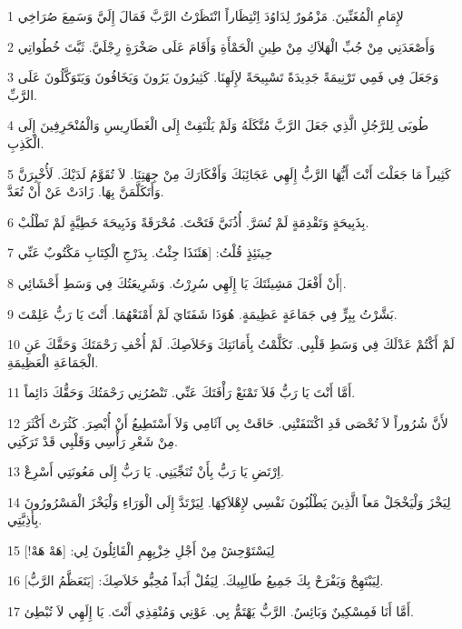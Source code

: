 \par 1 لإِمَامِ الْمُغَنِّينَ. مَزْمُورٌ لِدَاوُدَ اِنْتِظَاراً انْتَظَرْتُ الرَّبَّ فَمَالَ إِلَيَّ وَسَمِعَ صُرَاخِي
\par 2 وَأَصْعَدَنِي مِنْ جُبِّ الْهَلاَكِ مِنْ طِينِ الْحَمْأَةِ وَأَقَامَ عَلَى صَخْرَةٍ رِجْلَيَّ. ثَبَّتَ خُطُواتِي
\par 3 وَجَعَلَ فِي فَمِي تَرْنِيمَةً جَدِيدَةً تَسْبِيحَةً لإِلَهِنَا. كَثِيرُونَ يَرُونَ وَيَخَافُونَ وَيَتَوَكَّلُونَ عَلَى الرَّبِّ.
\par 4 طُوبَى لِلرَّجُلِ الَّذِي جَعَلَ الرَّبَّ مُتَّكَلَهُ وَلَمْ يَلْتَفِتْ إِلَى الْغَطَارِيسِ وَالْمُنْحَرِفِينَ إِلَى الْكَذِبِ.
\par 5 كَثِيراً مَا جَعَلْتَ أَنْتَ أَيُّهَا الرَّبُّ إِلَهِي عَجَائِبَكَ وَأَفْكَارَكَ مِنْ جِهَتِنَا. لاَ تُقَوَّمُ لَدَيْكَ. لَأُخْبِرَنَّ وَأَتَكَلَّمَنَّ بِهَا. زَادَتْ عَنْ أَنْ تُعَدَّ.
\par 6 بِذَبِيحَةٍ وَتَقْدِمَةٍ لَمْ تُسَرَّ. أُذُنَيَّ فَتَحْتَ. مُحْرَقَةً وَذَبِيحَةَ خَطِيَّةٍ لَمْ تَطْلُبْ.
\par 7 حِينَئِذٍ قُلْتُ: [هَئَنَذَا جِئْتُ. بِدَرْجِ الْكِتَابِ مَكْتُوبٌ عَنِّي
\par 8 أَنْ أَفْعَلَ مَشِيئَتَكَ يَا إِلَهِي سُرِرْتُ. وَشَرِيعَتُكَ فِي وَسَطِ أَحْشَائِي].
\par 9 بَشَّرْتُ بِبِرٍّ فِي جَمَاعَةٍ عَظِيمَةٍ. هُوَذَا شَفَتَايَ لَمْ أَمْنَعْهُمَا. أَنْتَ يَا رَبُّ عَلِمْتَ.
\par 10 لَمْ أَكْتُمْ عَدْلَكَ فِي وَسَطِ قَلْبِي. تَكَلَّمْتُ بِأَمَانَتِكَ وَخَلاَصِكَ. لَمْ أُخْفِ رَحْمَتَكَ وَحَقَّكَ عَنِ الْجَمَاعَةِ الْعَظِيمَةِ.
\par 11 أَمَّا أَنْتَ يَا رَبُّ فَلاَ تَمْنَعْ رَأْفَتَكَ عَنِّي. تَنْصُرُنِي رَحْمَتُكَ وَحَقُّكَ دَائِماً.
\par 12 لأَنَّ شُرُوراً لاَ تُحْصَى قَدِ اكْتَنَفَتْنِي. حَاقَتْ بِي آثَامِي وَلاَ أَسْتَطِيعُ أَنْ أُبْصِرَ. كَثُرَتْ أَكْثَرَ مِنْ شَعْرِ رَأْسِي وَقَلْبِي قَدْ تَرَكَنِي.
\par 13 اِرْتَضِ يَا رَبُّ بِأَنْ تُنَجِّيَنِي. يَا رَبُّ إِلَى مَعُونَتِي أَسْرِعْ.
\par 14 لِيَخْزَ وَلْيَخْجَلْ مَعاً الَّذِينَ يَطْلُبُونَ نَفْسِي لإِهْلاَكِهَا. لِيَرْتَدَّ إِلَى الْوَرَاءِ وَلْيَخْزَ الْمَسْرُورُونَ بِأَذِيَّتِي.
\par 15 لِيَسْتَوْحِشْ مِنْ أَجْلِ خِزْيِهِمِ الْقَائِلُونَ لِي: [هَهْ هَهْ!]
\par 16 لِيَبْتَهِجْ وَيَفْرَحْ بِكَ جَمِيعُ طَالِبِيكَ. لِيَقُلْ أَبَداً مُحِبُّو خَلاَصِكَ: [يَتَعَظَّمُ الرَّبُّ].
\par 17 أَمَّا أَنَا فَمِسْكِينٌ وَبَائِسٌ. الرَّبُّ يَهْتَمُّ بِي. عَوْنِي وَمُنْقِذِي أَنْتَ. يَا إِلَهِي لاَ تُبْطِئ.

